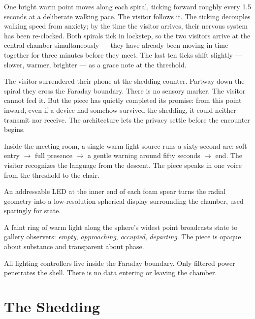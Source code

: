 \documentclass[]{anvil-installation}
\begin{document}
\begin{description}[style=nextline, leftmargin=0.6em, itemsep=0.5em]
  \item[Spiral spot guide.] One bright warm point moves along each spiral, ticking forward roughly every 1.5 seconds at a deliberate walking pace. The visitor follows it. The ticking decouples walking speed from anxiety; by the time the visitor arrives, their nervous system has been re-clocked. Both spirals tick in lockstep, so the two visitors arrive at the central chamber simultaneously --- they have already been moving in time together for three minutes before they meet. The last ten ticks shift slightly --- slower, warmer, brighter --- as a grace note at the threshold.
  \item[Crossing the boundary.] The visitor surrendered their phone at the shedding counter. Partway down the spiral they cross the Faraday boundary. There is no sensory marker. The visitor cannot feel it. But the piece has quietly completed its promise: from this point inward, even if a device had somehow survived the shedding, it could neither transmit nor receive. The architecture lets the privacy settle before the encounter begins.
  \item[The chamber light.] Inside the meeting room, a single warm light source runs a sixty-second arc: soft entry $\rightarrow$ full presence $\rightarrow$ a gentle warning around fifty seconds $\rightarrow$ end. The visitor recognizes the language from the descent. The piece speaks in one voice from the threshold to the chair.
  \item[Spear-tip pixels.] An addressable LED at the inner end of each foam spear turns the radial geometry into a low-resolution spherical display surrounding the chamber, used sparingly for state.
  \item[The exterior shell.] A faint ring of warm light along the sphere's widest point broadcasts state to gallery observers: \textit{empty}, \textit{approaching}, \textit{occupied}, \textit{departing}. The piece is opaque about substance and transparent about phase.
\end{description}

All lighting controllers live inside the Faraday boundary. Only filtered power penetrates the shell. There is no data entering or leaving the chamber.

\section{The Shedding}
\end{document}
